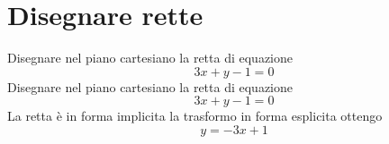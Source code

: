 \section{Disegnare rette}
\begin{exercise}
	Disegnare nel piano cartesiano la retta di equazione \[3x+y-1=0\]
	\tcblower
	Disegnare nel piano cartesiano la retta di equazione \[3x+y-1=0\]
	La retta è in forma implicita la trasformo in forma esplicita ottengo\[y=-3x+1\]
	\begin{center}
		
		\label{fig:DiegnareRette1}
	\end{center}
\end{exercise}